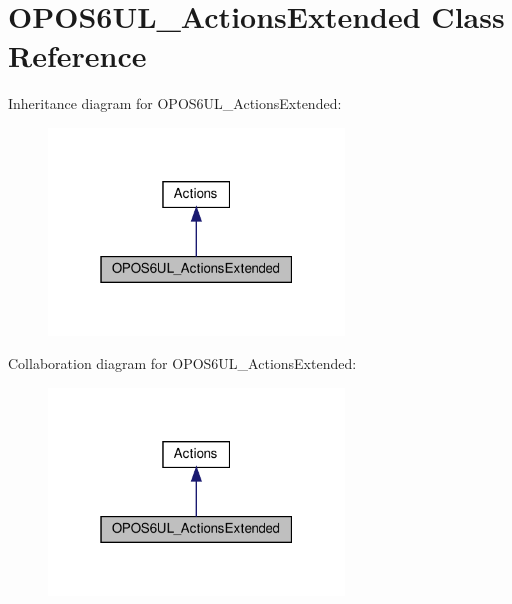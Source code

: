 \hypertarget{classOPOS6UL__ActionsExtended}{}\section{O\+P\+O\+S6\+U\+L\+\_\+\+Actions\+Extended Class Reference}
\label{classOPOS6UL__ActionsExtended}


Inheritance diagram for O\+P\+O\+S6\+U\+L\+\_\+\+Actions\+Extended\+:
\nopagebreak
\begin{figure}[H]
\begin{center}
\leavevmode
\includegraphics[width=223pt]{classOPOS6UL__ActionsExtended__inherit__graph}
\end{center}
\end{figure}


Collaboration diagram for O\+P\+O\+S6\+U\+L\+\_\+\+Actions\+Extended\+:
\nopagebreak
\begin{figure}[H]
\begin{center}
\leavevmode
\includegraphics[width=223pt]{classOPOS6UL__ActionsExtended__coll__graph}
\end{center}
\end{figure}
